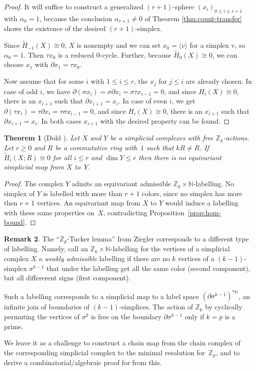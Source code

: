 \documentclass[11pt,a4paper,draft]{article}
\newcommand{\Z}{{\mathbb Z}}
\newcommand{\N}{{\mathbb N}}
\newcommand\isom{\cong}
\newcommand\simp[1]{\langle#1\rangle}
\newcommand{\dd}{\partial}
\newtheorem{theorem}{Theorem}[section]
\theoremstyle{definition}
\newtheorem{remark}[theorem]{Remark}
\begin{document}
\begin{proof}
It will suffice to construct  a generalized $(r+1)$-sphere
 $(x_i)_{0 \leq i \leq r+1}$ with 
$\alpha_0=1$, because the conclusion $\alpha_{r+1} \ne 0$ of 
Theorem \ref{thm:count-transfer} shows the
existence of the desired $(r+1)$-simplex.

Since $\widetilde H_{-1}(X)\isom0$, $X$ is nonempty and we can set
$x_0=\simp v$ for a simplex v, so $\alpha_0=1$.  Then $\tau x_0$ is a
reduced $0$-cycle.  Further, because $\widetilde
H_{0}(X)\isom0$, we can choose $x_1$ with $\dd x_1=\tau x_0$.

Now assume that for some $i$ with  $1\le i\leq r$, the $x_j$ for $j\le i$ are
already chosen.  In case of odd $i$, we have $\dd(\sigma x_i)=\sigma\dd
x_i=\sigma\tau x_{i-1}=0$, and since $H_i(X)\isom0$, there is an
$x_{i+1}$ such that $\dd x_{i+1}=x_i$.
In case of even $i$,
we get $\dd(\tau x_i)=\tau\dd x_i=\tau\sigma x_{i-1}=0$, and since
$H_i(X)\isom0$, there is an $x_{i+1}$ such that $\dd x_{i+1}=x_i$.  In
both cases $x_{i+1}$ with the desired property can be found.
\end{proof}



\begin{theorem}[Dold \cite{Dold}]\label{thm:dold}
Let $X$ and $Y$ be a simplicial complexes with free $\Z_k$-actions.
Let $r\ge 0$ and $R$ be a commutative ring with~$1$ such that $kR\ne R$.
If $\widetilde H_i(X;R)\isom 0$ for all $i\leq r$ and $\dim Y\le r$
then there is no equivariant simplicial map from $X$ to~$Y$.
\end{theorem}

\begin{proof}
The complex $Y$ admits an equivariant admissible
$\Z_k\times\N$-labelling.  No simplex of $Y$ is labelled with more
than $r+1$ colors, since no simplex has more then $r+1$ vertices.
An
equivariant map from $X$ to $Y$ would induce a labelling with these
same properties on~$X$, contradicting Proposition~\ref{prop:hom-bound}.
\end{proof}

\begin{remark}
The ``$\Z_p$-Tucker lemma'' from Ziegler \cite[Lemma 5.3]{Z77}
corresponds to a different type of labelling.
Namely, call an $\Z_k\times\N$-labelling for the vertices
of a simplicial complex $X$ a \emph{weakly admissible} labelling
if there are no $k$ vertices of a $(k-1)$-simplex $\sigma^{k-1}$ that under the
labelling get all the same color (second component), but all differerent
signs (first component).

Such a labelling corresponds to a simplicial map to a label space
$(\partial \sigma^{k-1})^{*\N}$,
an infinite join of boundaries of $(k-1)$-simplices.
The action of $\Z_k$ by cyclically permuting the vertices of $\sigma^k$
is free on the boundary $\partial \sigma^{k-1}$ only if $k=p$ is a
prime.

We leave it as a challenge to construct a chain map from the
chain complex of the corresponding simplicial complex
to the minimal resolution for~$\Z_p$, and to derive a
combinatorial/algebraic proof for \cite[Lemma 5.3]{Z77} from this.
\end{remark}
\end{document}
